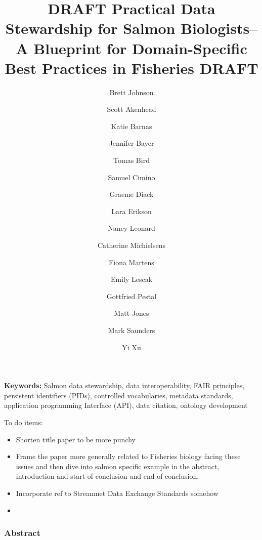 \documentclass[
  letterpaper,
  DIV=11,
  numbers=noendperiod]{scrartcl}
\title{DRAFT Practical Data Stewardship for Salmon Biologists--A
Blueprint for Domain-Specific Best Practices in Fisheries DRAFT}
\author{Brett Johnson \and Scott Akenhead \and Katie
Barnas \and Jennifer Bayer \and Tomas Bird \and Samuel
Cimino \and Graeme Diack \and Lara Erikson \and Nancy
Leonard \and Catherine Michielsens \and Fiona Martens \and Emily
Lescak \and Gottfried Pestal \and Matt Jones \and Mark Saunders \and Yi
Xu}
\date{}
\begin{document}
\maketitle


\textbf{Keywords:} Salmon data stewardship, data interoperability, FAIR
principles, persistent identifiers (PIDs), controlled vocabularies,
metadata standards, application programming Interface (API), data
citation, ontology development

To do items:

\begin{itemize}
\item
  Shorten title paper to be more punchy
\item
  Frame the paper more generally related to Fisheries biology facing
  these issues and then dive into salmon specific example in the
  abstract, introduction and start of conclusion and end of conclusion.
\end{itemize}

\begin{itemize}
\item
  Incorporate ref to Streamnet Data Exchange Standards somehow
\item
\end{itemize}

\subsubsection{Abstract}\label{abstract}
\end{document}
